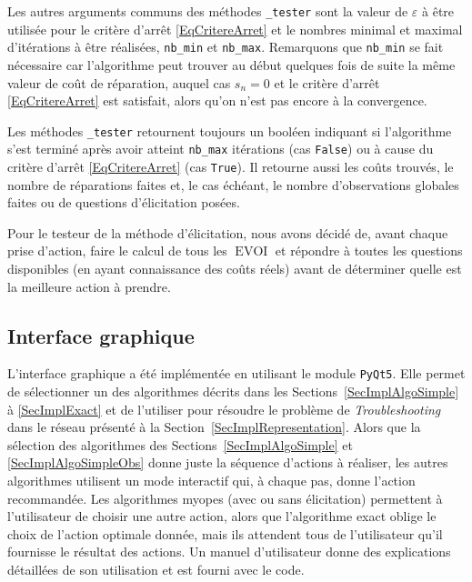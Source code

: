 \documentclass[a4paper,11pt]{article}
\theoremstyle{plain}
\theoremstyle{definition}
\DeclareMathOperator{\EVOI}{EVOI}
\begin{document}
Les autres arguments communs des méthodes \texttt{\_tester} sont la valeur de $\varepsilon$ à être utilisée pour le critère d'arrêt \eqref{EqCritereArret} et le nombres minimal et maximal d'itérations à être réalisées, \texttt{nb\_min} et \texttt{nb\_max}. Remarquons que \texttt{nb\_min} se fait nécessaire car l'algorithme peut trouver au début quelques fois de suite la même valeur de coût de réparation, auquel cas $s_n = 0$ et le critère d'arrêt \eqref{EqCritereArret} est satisfait, alors qu'on n'est pas encore à la convergence.

Les méthodes \texttt{\_tester} retournent toujours un booléen indiquant si l'algorithme s'est terminé après avoir atteint \texttt{nb\_max} itérations (cas \texttt{False}) ou à cause du critère d'arrêt \eqref{EqCritereArret} (cas \texttt{True}). Il retourne aussi les coûts trouvés, le nombre de réparations faites et, le cas échéant, le nombre d'observations globales faites ou de questions d'élicitation posées.

Pour le testeur de la méthode d'élicitation, nous avons décidé de, avant chaque prise d'action, faire le calcul de tous les $\EVOI$ et répondre à toutes les questions disponibles (en ayant connaissance des coûts réels) avant de déterminer quelle est la meilleure action à prendre.

\subsection{Interface graphique}
\label{SecImplInterface}

L'interface graphique a été implémentée en utilisant le module \texttt{PyQt5}. Elle permet de sélectionner un des algorithmes décrits dans les Sections~\ref{SecImplAlgoSimple} à \ref{SecImplExact} et de l'utiliser pour résoudre le problème de \emph{Troubleshooting} dans le réseau présenté à la Section~\ref{SecImplRepresentation}. Alors que la sélection des algorithmes des Sections~\ref{SecImplAlgoSimple} et \ref{SecImplAlgoSimpleObs} donne juste la séquence d'actions à réaliser, les autres algorithmes utilisent un mode interactif qui, à chaque pas, donne l'action recommandée. Les algorithmes myopes (avec ou sans élicitation) permettent à l'utilisateur de choisir une autre action, alors que l'algorithme exact oblige le choix de l'action optimale donnée, mais ils attendent tous de l'utilisateur qu'il fournisse le résultat des actions. Un manuel d'utilisateur donne des explications détaillées de son utilisation et est fourni avec le code.
\end{document}
